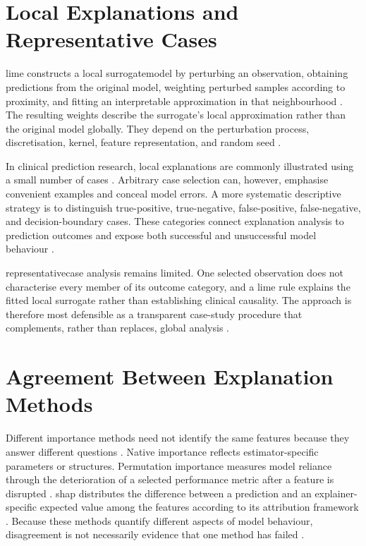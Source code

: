 \section{Local Explanations and Representative Cases}

\gls{lime} constructs a local \gls{surrogatemodel} by perturbing an observation, obtaining predictions from the original model, weighting perturbed samples according to proximity, and fitting an interpretable approximation in that neighbourhood \citep{ribeiro_why_2016}. The resulting weights describe the surrogate's local approximation rather than the original model globally. They depend on the perturbation process, discretisation, kernel, feature representation, and random seed \citep{ribeiro_why_2016, linardatos_explainable_2020, vilone_classification_2021}.

In clinical prediction research, local explanations are commonly illustrated using a small number of cases \citep{tjoa_survey_2021, yang_unbox_2021}. Arbitrary case selection can, however, emphasise convenient examples and conceal model errors. A more systematic descriptive strategy is to distinguish true-positive, true-negative, false-positive, false-negative, and decision-boundary cases. These categories connect explanation analysis to prediction outcomes and expose both successful and unsuccessful model behaviour \citep{mohseni_multidisciplinary_2021, canha_functionally-grounded_2025}.

\Gls{representativecase} analysis remains limited. One selected observation does not characterise every member of its outcome category, and a \gls{lime} rule explains the fitted local surrogate rather than establishing clinical causality. The approach is therefore most defensible as a transparent case-study procedure that complements, rather than replaces, global analysis \citep{ribeiro_why_2016, vilone_classification_2021, mohseni_multidisciplinary_2021}.

\section{Agreement Between Explanation Methods}

Different importance methods need not identify the same features because they answer different questions \citep{linardatos_explainable_2020, vilone_classification_2021}. Native importance reflects estimator-specific parameters or structures. Permutation importance measures model reliance through the deterioration of a selected performance metric after a feature is disrupted \citep{fisher_models_2019}. \gls{shap} distributes the difference between a prediction and an explainer-specific expected value among the features according to its attribution framework \citep{NIPS2017_8a20a862}. Because these methods quantify different aspects of model behaviour, disagreement is not necessarily evidence that one method has failed \citep{vilone_classification_2021}.

